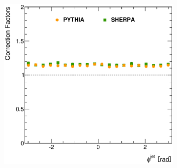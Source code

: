 \documentclass[12pt, twoside]{article}
\numberwithin{equation}{section}
\numberwithin{figure}{section}
\newenvironment{changemargin}[2]{%
\begin{list}{}{%
\setlength{\topsep}{0pt}%
\setlength{\leftmargin}{#1}%
\setlength{\rightmargin}{#2}%
\setlength{\listparindent}{\parindent}%
\setlength{\itemindent}{\parindent}%
\setlength{\parsep}{\parskip}%
}%
\item[]}{\end{list}}
\begin{document}
\begin{figure}
\begin{changemargin}{-1.0cm}{-0.75cm}
\begin{changemargin}{-0.75cm}{-1.0cm}
\begin{subfigure}[b]{0.37\textwidth}
            \subcaption{}
            \label{fig:CorrectionFactorRapidityJet}
        \end{subfigure}
        \begin{subfigure}[b]{0.37\textwidth}
            \includegraphics[width=\textwidth]{./images/CorrectionFactors/CORR_FACT-106.eps}
            \subcaption{}
            \label{fig:CorrectionFactorPhiJet}
        \end{subfigure}


\end{changemargin}
\end{changemargin}
\end{figure}
\end{document}
